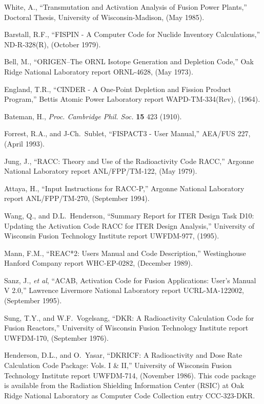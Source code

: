 \begin{thebibliography}{100}


 White, A., ``Transmutation and Activation
  Analysis of Fusion Power Plants,'' Doctoral Thesis, University of
  Wisconsin-Madison, (May 1985).
  
 Barstall, R.F., ``FISPIN - A Computer Code for
  Nuclide Inventory Calculations,'' ND-R-328(R), (October 1979).
  
 Bell, M., ``ORIGEN--The ORNL Isotope Generation and
  Depletion Code,'' Oak Ridge National Laboratory report ORNL-4628,
  (May 1973).
  
 England, T.R., ``CINDER - A One-Point Depletion and
  Fission Product Program,'' Bettis Atomic Power Laboratory report
  WAPD-TM-334(Rev), (1964).
  
 Bateman, H., \textsl{Proc. Cambridge Phil. Soc.}
  \textbf{15} 423 (1910).
  
 Forrest, R.A., and J-Ch.~Sublet, ``FISPACT3 - User
  Manual,'' AEA/FUS 227, (April 1993).
  
 Jung, J., ``RACC: Theory and Use of the Radioactivity
  Code RACC,'' Argonne National Laboratory report ANL/FPP/TM-122, (May
  1979).
  
 Attaya, H., ``Input Instructions for RACC-P,'' Argonne
  National Laboratory report ANL/FPP/TM-270, (September 1994).
  
 Wang, Q., and D.L.~Henderson, ``Summary Report for
  ITER Design Task D10: Updating the Activation Code RACC for ITER
  Design Analysis,'' University of Wisconsin Fusion Technology
  Institute report UWFDM-977, (1995).
  
 Mann, F.M., ``REAC*2: Users Manual and Code
  Description,'' Westinghouse Hanford Company report WHC-EP-0282,
  (December 1989).
  
 Sanz, J., \textsl{et al}, ``ACAB, Activation Code for
  Fusion Applications: User's Manual V 2.0,'' Lawrence Livermore
  National Laboratory report UCRL-MA-122002, (September 1995).
  
 Sung, T.Y., and W.F.~Vogelsang, ``DKR: A Radioactivity
  Calculation Code for Fusion Reactors,'' University of Wisconsin
  Fusion Technology Institute report UWFDM-170, (September 1976).
  
 Henderson, D.L., and O.~Yasar, ``DKRICF: A
  Radioactivity and Dose Rate Calculation Code Package: Vols. I \&
  II,'' University of Wisconsin Fusion Technology Institute report
  UWFDM-714, (November 1986).  This code
  package is available from the Radiation Shielding Information Center
  (RSIC) at Oak Ridge National Laboratory as Computer Code Collection
  entry CCC-323-DKR.
  

\end{thebibliography}
